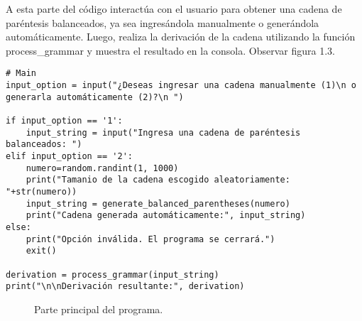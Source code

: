 

A esta parte del código interactúa con el usuario para obtener una cadena de paréntesis balanceados, ya sea ingresándola manualmente o generándola automáticamente. Luego, realiza la derivación de la cadena utilizando la función process\_grammar y muestra el resultado en la consola. Observar figura 1.3.\newline



\begin{lstlisting}
# Main
input_option = input("¿Deseas ingresar una cadena manualmente (1)\n o generarla automáticamente (2)?\n ")

if input_option == '1':
    input_string = input("Ingresa una cadena de paréntesis balanceados: ")
elif input_option == '2':
    numero=random.randint(1, 1000)
    print("Tamanio de la cadena escogido aleatoriamente: "+str(numero))
    input_string = generate_balanced_parentheses(numero)
    print("Cadena generada automáticamente:", input_string)
else:
    print("Opción inválida. El programa se cerrará.")
    exit()

derivation = process_grammar(input_string)
print("\n\nDerivación resultante:", derivation)

\end{lstlisting}
\begin{figure}[h]
\begin{center}
\end{center}
\caption{Parte principal del programa.}
\label{fig:imagen}
\end{figure}
